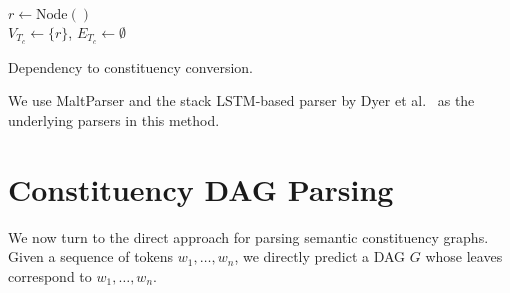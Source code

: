 \documentclass[11pt]{article}
\begin{document}
\begin{algorithm}
 $r \leftarrow \mathrm{Node()}$\\
 $V_{T_c} \leftarrow \{r\}$,
 $E_{T_c} \leftarrow \emptyset$\\
 \caption{Dependency to constituency conversion.}
 \label{alg:dep2con}
\end{algorithm}

We use MaltParser \cite{nivre2007maltparser} and the stack LSTM-based parser by Dyer et al.~ as the underlying parsers in this method.

\section{Constituency DAG Parsing}\label{sec:direct_approach}

We now turn to the direct approach for parsing semantic constituency graphs. Given a sequence
of tokens $w_1, \ldots, w_n$, we directly predict a DAG $G$ whose leaves
correspond to  $w_1, \ldots, w_n$.

\end{document}

